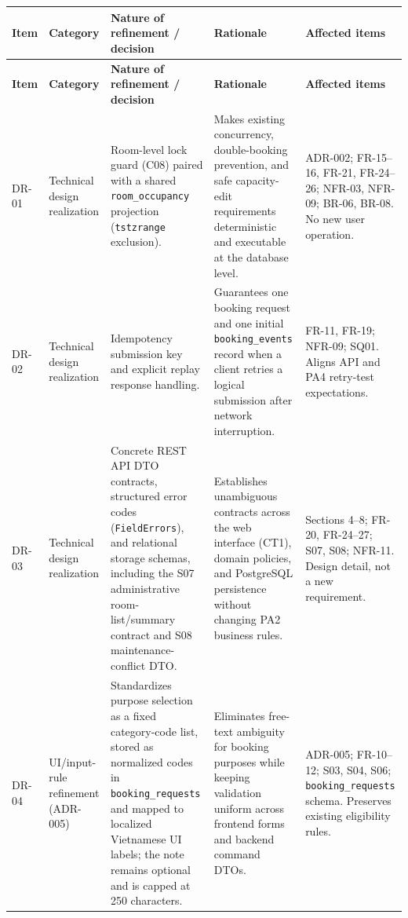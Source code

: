 \begingroup
\footnotesize
{}
\setlength{\tabcolsep}{2pt}
\renewcommand{\arraystretch}{1.1}
\begin{longtable}{|>{\raggedright\arraybackslash}p{}|>{\raggedright\arraybackslash}p{}|>{\raggedright\arraybackslash}p{}|>{\raggedright\arraybackslash}p{}|>{\raggedright\arraybackslash}p{}|}
\hline
\textbf{Item} & \textbf{Category} & \textbf{Nature of refinement / decision} & \textbf{Rationale} & \textbf{Affected items} \\
\hline
\endfirsthead
\hline
\textbf{Item} & \textbf{Category} & \textbf{Nature of refinement / decision} & \textbf{Rationale} & \textbf{Affected items} \\
\hline
\endhead
\hline
\endfoot
\hline
\endlastfoot
DR-01 & Technical design realization & Room-level lock guard (C08) paired with a shared \texttt{room\_occupancy} projection (\texttt{tstzrange} exclusion). & Makes existing concurrency, double-booking prevention, and safe capacity-edit requirements deterministic and executable at the database level. & ADR-002; FR-15--16, FR-21, FR-24--26; NFR-03, NFR-09; BR-06, BR-08. No new user operation. \\ \hline
DR-02 & Technical design realization & Idempotency submission key and explicit replay response handling. & Guarantees one booking request and one initial \texttt{booking\_events} record when a client retries a logical submission after network interruption. & FR-11, FR-19; NFR-09; SQ01. Aligns API and PA4 retry-test expectations. \\ \hline
DR-03 & Technical design realization & Concrete REST API DTO contracts, structured error codes (\texttt{FieldErrors}), and relational storage schemas, including the S07 administrative room-list/summary contract and S08 maintenance-conflict DTO. & Establishes unambiguous contracts across the web interface (CT1), domain policies, and PostgreSQL persistence without changing PA2 business rules. & Sections 4--8; FR-20, FR-24--27; S07, S08; NFR-11. Design detail, not a new requirement. \\ \hline
DR-04 & UI/input-rule refinement (ADR-005) & Standardizes purpose selection as a fixed category-code list, stored as normalized codes in \texttt{booking\_requests} and mapped to localized Vietnamese UI labels; the note remains optional and is capped at 250 characters. & Eliminates free-text ambiguity for booking purposes while keeping validation uniform across frontend forms and backend command DTOs. & ADR-005; FR-10--12; S03, S04, S06; \texttt{booking\_requests} schema. Preserves existing eligibility rules. \\ \hline

\end{longtable}
